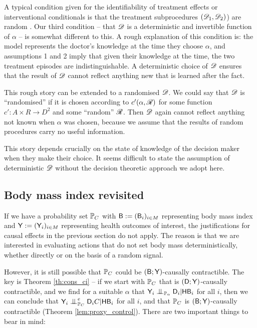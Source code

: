 A typical condition given for the identifiability of treatment effects or interventional conditionals is that the treatment subprocedures $(\mathscr{D}_1,\mathscr{D}_2)$) are random \citep{rubin_causal_2005}. Our third condition -- that $\mathscr{D}$ is a deterministic and invertible function of $\alpha$ -- is somewhat different to this. A rough explanation of this condition is: the model represents the doctor's knowledge at the time they choose $\alpha$, and assumptions 1 and 2 imply that given their knowledge at the time, the two treatment episodes are indistinguishable. A deterministic choice of $\mathscr{D}$ ensures that the result of $\mathscr{D}$ cannot reflect anything new that is learned after the fact.

This rough story can be extended to a randomised $\mathscr{D}$. We could say that $\mathscr{D}$ is ``randomised'' if it is chosen according to $c'(\alpha,\mathscr{R})$ for some function $c':A\times R\to D^2$ and some ``random'' $\mathscr{R}$. Then $\mathscr{D}$ again cannot reflect anything not known when $\alpha$ was chosen, because we assume that the results of random procedures carry no useful information.

This story depends crucially on the state of knowledge of the decision maker when they make their choice. It seems difficult to state the assumption of deterministic $\mathscr{D}$ without the decision theoretic approach we adopt here.


\subsection{Body mass index revisited}

If we have a probability set $\mathbb{P}_C$ with $\mathsf{B}:=(\mathsf{B}_i)_{i\in M}$ representing body mass index and $\mathsf{Y}:=(\mathsf{Y}_i)_{i\in M}$ representing health outcomes of interest, the justifications for causal effects in the previous section do not apply. The reason is that we are interested in evaluating actions that do not set body mass deterministically, whether directly or on the basis of a random signal.

However, it is still possible that $\mathbb{P}_C$ could be $(\mathsf{B};\mathsf{Y})$-causally contractible. The key is Theorem \ref{th:cons_ci} -- if we start with $\mathbb{P}_C$ that is $(\mathsf{D};\mathsf{Y})$-causally contractible, and we find for a suitable $\alpha$ that $\RV{Y}_i\CI_{\prob{P}_\alpha} \RV{D}_i |\RV{H}\RV{B}_i$ for all $i$, then we can conclude that $\RV{Y}_i\CI_{\prob{P}_C}^e \RV{D}_i C|\RV{H}\RV{B}_i$ for all $i$, and that $\mathbb{P}_C$ is $(\mathsf{B};\mathsf{Y})$-causally contractible (Theorem \ref{lem:proxy_control}). There are two important things to bear in mind:

